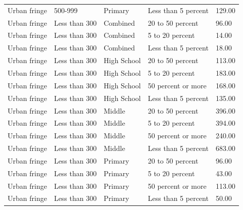 \documentclass[
  man, fleqn, noextraspace]{apa6}
\begin{document}
\begin{table}[tbp]
\begin{center}
\begin{threeparttable}
\begin{tabular}{lllll}
Urban fringe & 500-999 & Primary & Less than 5 percent & 129.00\\
Urban fringe & Less than 300 & Combined & 20 to 50 percent & 96.00\\
Urban fringe & Less than 300 & Combined & 5 to 20 percent & 14.00\\
Urban fringe & Less than 300 & Combined & Less than 5 percent & 18.00\\
Urban fringe & Less than 300 & High School & 20 to 50 percent & 113.00\\
Urban fringe & Less than 300 & High School & 5 to 20 percent & 183.00\\
Urban fringe & Less than 300 & High School & 50 percent or more & 168.00\\
Urban fringe & Less than 300 & High School & Less than 5 percent & 135.00\\
Urban fringe & Less than 300 & Middle & 20 to 50 percent & 396.00\\
Urban fringe & Less than 300 & Middle & 5 to 20 percent & 394.00\\
Urban fringe & Less than 300 & Middle & 50 percent or more & 240.00\\
Urban fringe & Less than 300 & Middle & Less than 5 percent & 683.00\\
Urban fringe & Less than 300 & Primary & 20 to 50 percent & 96.00\\
Urban fringe & Less than 300 & Primary & 5 to 20 percent & 43.00\\
Urban fringe & Less than 300 & Primary & 50 percent or more & 113.00\\
Urban fringe & Less than 300 & Primary & Less than 5 percent & 50.00\\
\bottomrule
\end{tabular}
\end{threeparttable}
\end{center}
\end{table}
\end{document}
